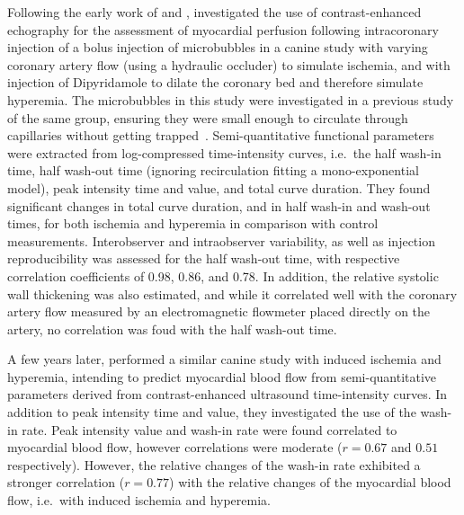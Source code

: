 Following the early work of \citet{Armstrong:1982tq} and \citet{Tei:1983ul}, \citet{TenCate:1984hl} investigated the use of contrast-enhanced echography for the assessment of myocardial perfusion following intracoronary injection of a bolus injection of microbubbles in a canine study with varying coronary artery flow (using a hydraulic occluder) to simulate ischemia, and with injection of Dipyridamole to dilate the coronary bed and therefore simulate hyperemia.
The microbubbles in this study were investigated in a previous study of the same group, ensuring they were small enough to circulate through capillaries without getting trapped~\cite{Feinstein:1984gk}. 
Semi-quantitative functional parameters were extracted from log-compressed time-intensity curves, i.e.~the half wash-in time, half wash-out time (ignoring recirculation fitting a mono-exponential model), peak intensity time and value, and total curve duration.
They found significant changes in total curve duration, and in half wash-in and wash-out times, for both ischemia and hyperemia in comparison with control measurements.
Interobserver and intraobserver variability, as well as injection reproducibility was assessed for the half wash-out time, with respective correlation coefficients of 0.98, 0.86, and 0.78.
In addition, the relative systolic wall thickening was also estimated, and while it correlated well with the coronary artery flow measured by an electromagnetic flowmeter placed directly on the artery, no correlation was foud with the half wash-out time. 

A few years later, \citet{Vandenberg:1989bza} performed a similar canine study with induced ischemia and hyperemia, intending to predict myocardial blood flow from semi-quantitative parameters derived from contrast-enhanced ultrasound time-intensity curves. 
In addition to peak intensity time and value, they investigated the use of the wash-in rate. 
Peak intensity value and wash-in rate were found correlated to myocardial blood flow, however correlations were moderate ($r = 0.67$ and $0.51$ respectively).
However, the relative changes of the wash-in rate exhibited a stronger correlation ($r = 0.77$) with the relative changes of the myocardial blood flow, i.e.~with induced ischemia and hyperemia.

